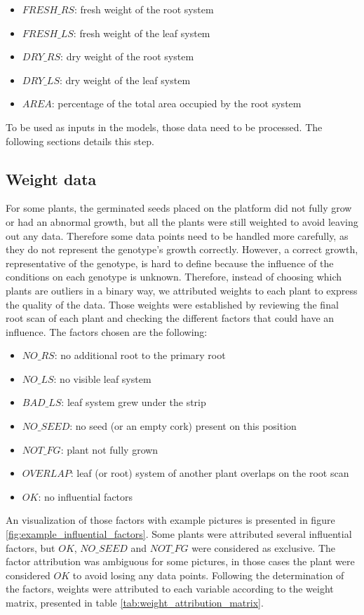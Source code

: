 \begin{itemize}
\item $FRESH\_RS$: fresh weight of the root system
\item $FRESH\_LS$: fresh weight of the leaf system
\item $DRY\_RS$: dry weight of the root system
\item $DRY\_LS$: dry weight of the leaf system
\item $AREA$: percentage of the total area occupied by the root system
\end{itemize} 

To be used as inputs in the models, those data need to be processed. The following sections details this step.

\subsection{Weight data}
For some plants, the germinated seeds placed on the platform did not fully grow or had an abnormal growth, but all the plants were still weighted to avoid leaving out any data. Therefore some data points need to be handled more carefully, as they do not represent the genotype's growth correctly. However, a correct growth, representative of the genotype, is hard to define because the influence of the conditions on each genotype is unknown. Therefore, instead of choosing which plants are outliers in a binary way, we attributed weights to each plant to express the quality of the data. Those weights were established by reviewing the final root scan of each plant and checking the different factors that could have an influence. The factors chosen are the following:

\begin{itemize}
\item $NO\_RS$: no additional root to the primary root
\item $NO\_LS$: no visible leaf system 
\item $BAD\_LS$: leaf system grew under the strip
\item  $NO\_SEED$: no seed (or an empty cork) present on this position
\item $NOT\_FG$: plant not fully grown
\item $OVERLAP$: leaf (or root) system of another plant overlaps on the root scan
\item $OK$: no influential factors
\end{itemize} 

An visualization of those factors with example pictures is presented in figure \ref{fig:example_influential_factors}. Some plants were attributed several influential factors, but $OK$, $NO\_SEED$ and $NOT\_FG$ were considered as exclusive. The factor attribution was ambiguous for some pictures, in those cases the plant were considered $OK$ to avoid losing any data points.
Following the determination of the factors, weights were attributed to each variable according to the weight matrix, presented in table \ref{tab:weight_attribution_matrix}.

